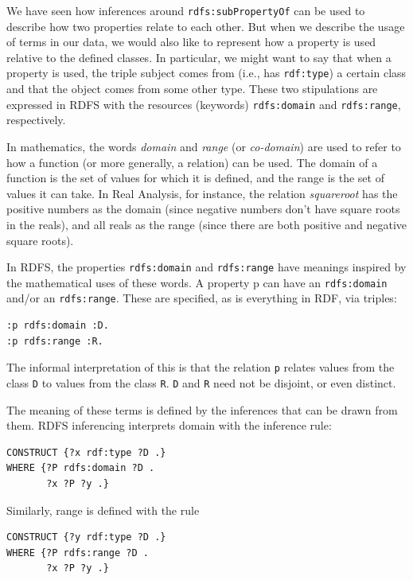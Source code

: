 We have seen how inferences around \texttt{rdfs:subPropertyOf} can be used to
describe how two properties relate to each other. But when we describe
the usage of terms in our data, we would also like to represent how a
property is used relative to the defined classes. In particular, we
might want to say that when a property is used, the triple subject comes
from (i.e., has \texttt{rdf:type}) a certain class and that the object comes from
some other type. These two stipulations are expressed in RDFS with the
resources (keywords) \texttt{rdfs:domain} and \texttt{rdfs:range}, respectively.

In mathematics, the words \emph{domain} and \emph{range} (or \emph{co-domain}) are used to
refer to how a function (or more generally, a relation) can be used. The
domain of a function is the set of values for which it is defined, and
the range is the set of values it can take. In Real Analysis, for
instance, the relation \emph{squareroot} has the positive numbers as the domain
(since negative numbers don't have square roots in the reals), and all
reals as the range (since there are both positive and negative square
roots).

In RDFS, the properties \texttt{rdfs:domain} and \texttt{rdfs:range} have meanings
inspired by the mathematical uses of these words. A property p can have
an \texttt{rdfs:domain} and/or an \texttt{rdfs:range}. These are specified, as is
everything in RDF, via triples:

\begin{lstlisting}
:p rdfs:domain :D.
:p rdfs:range :R.
\end{lstlisting}

The informal interpretation of this is that the relation \texttt{p} relates
values from the class \texttt{D} to values from the class \texttt{R}. \texttt{D} and \texttt{R} need not be
disjoint, or even distinct.

The meaning of these terms is defined by the inferences that can be
drawn from them. RDFS
inferencing interprets domain with the inference rule:

\begin{lstlisting}
CONSTRUCT {?x rdf:type ?D .}
WHERE {?P rdfs:domain ?D .
       ?x ?P ?y .}
\end{lstlisting}

Similarly, range is defined with the rule

\begin{lstlisting}
CONSTRUCT {?y rdf:type ?D .}
WHERE {?P rdfs:range ?D .
       ?x ?P ?y .}
\end{lstlisting}

